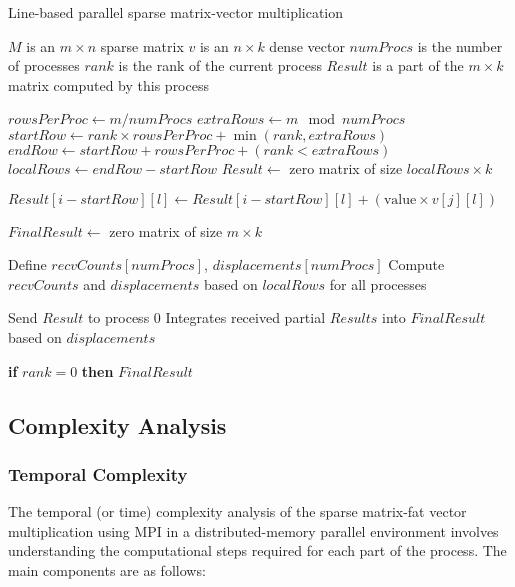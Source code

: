 \documentclass[12pt,oneside]{book} %
\begin{document}
\begin{algorithm}[H]
    \caption{Line-based parallel sparse matrix-vector multiplication}
    \begin{algorithmic}
        \Require $M$ is an $m \times n$ sparse matrix
        \Require $v$ is an $n \times k$ dense vector
        \Require $numProcs$ is the number of processes
        \Require $rank$ is the rank of the current process
        \Ensure $Result$ is a part of the $m \times k$ matrix computed by this process

        \State $rowsPerProc \gets m / numProcs$
        \State $extraRows \gets m\mod numProcs$
        \State $startRow \gets rank \times rowsPerProc + \min(rank, extraRows)$
        \State $endRow \gets startRow + rowsPerProc + (rank < extraRows)$
        \State $localRows \gets endRow - startRow$
        \State $Result \gets$ zero matrix of size $localRows \times k$

        \State $Result[i - startRow][l] \gets Result[i - startRow][l] + (\text{value} \times v[j][l])$
        \EndFor
        \EndFor
        \EndFor

        \State $FinalResult \gets$ zero matrix of size $m \times k$
        \EndIf

        \State Define $recvCounts[numProcs]$, $displacements[numProcs]$
        \State Compute $recvCounts$ and $displacements$ based on $localRows$ for all processes

        \State Send $Result$ to process $0$
        \Else
        \State Integrates received partial $Results$ into $FinalResult$ based on $displacements$
        \EndFor
        \EndIf

        \State \textbf{if} $rank = 0$ \textbf{then} \Return $FinalResult$
    \end{algorithmic}
\end{algorithm}

\subsection{Complexity Analysis}
\subsubsection{Temporal Complexity}
The temporal (or time) complexity analysis of the sparse matrix-fat vector
multiplication using MPI in a distributed-memory parallel environment involves
understanding the computational steps required for each part of the process.
The main components are as follows:
\end{document}
